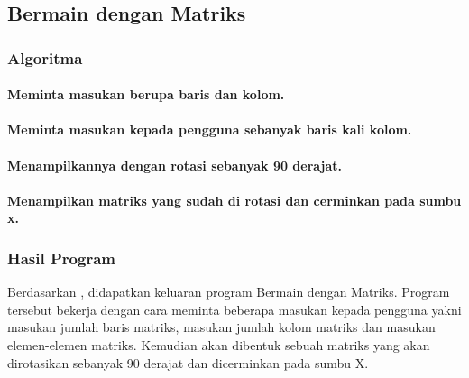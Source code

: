 \documentclass{subfiles}
\begin{document}
\subsection{Bermain dengan Matriks}
\subsubsection{Algoritma}
\paragraph{Meminta masukan berupa baris dan kolom.}
\paragraph{Meminta masukan kepada pengguna sebanyak baris kali kolom.}
\paragraph{Menampilkannya dengan rotasi sebanyak 90 derajat.}
\paragraph{Menampilkan matriks yang sudah di rotasi dan cerminkan pada sumbu x.}
\subsubsection{\Flowchart}
\vspace{-0.3ex}
\subsubsection{\SourceCode}
\vspace{-0.5ex}
\begin{indentlevel0}
    
    
\end{indentlevel0}
\subsubsection{Hasil Program}
\begin{indentlevel0}
    \ilz{}Berdasarkan , didapatkan keluaran program Bermain dengan Matriks. Program tersebut bekerja dengan cara meminta beberapa masukan kepada pengguna yakni masukan jumlah baris matriks, masukan jumlah kolom matriks dan masukan elemen-elemen matriks. Kemudian akan dibentuk sebuah matriks yang akan dirotasikan sebanyak 90 derajat dan dicerminkan pada sumbu X.
\end{indentlevel0}
\end{document}
